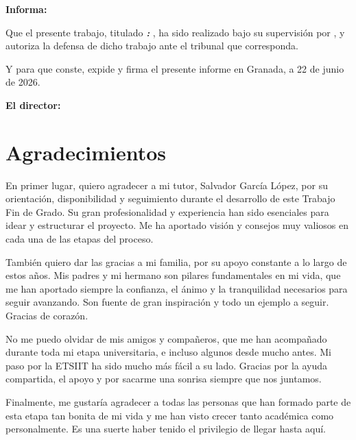 \vspace{0.5cm}

\textbf{Informa:}

\vspace{0.5cm}

Que el presente trabajo, titulado \textit{\textbf{\myTitle: \mySubTitle}},
ha sido realizado bajo su supervisión por \textbf{\myName}, y autoriza la defensa de dicho trabajo ante el tribunal
que corresponda.

\vspace{0.5cm}

Y para que conste, expide y firma el presente informe en Granada, a 22 de junio de 2026.

\vspace{1cm}

\textbf{El director:}

\vspace{5cm}

\noindent \textbf{\myProf}



\chapter*{Agradecimientos}
\thispagestyle{empty}

\vspace{1cm}

En primer lugar, quiero agradecer a mi tutor, Salvador García López, por su orientación, disponibilidad y seguimiento durante el desarrollo de este Trabajo Fin de Grado. Su gran profesionalidad y experiencia han sido esenciales para idear y estructurar el proyecto. Me ha aportado visión y consejos muy valiosos en cada una de las etapas del proceso.

También quiero dar las gracias a mi familia, por su apoyo constante a lo largo de estos años. Mis padres y mi hermano son pilares fundamentales en mi vida, que me han aportado siempre la confianza, el ánimo y la tranquilidad necesarios para seguir avanzando. Son fuente de gran inspiración y todo un ejemplo a seguir. Gracias de corazón.

No me puedo olvidar de mis amigos y compañeros, que me han acompañado durante toda mi etapa universitaria, e incluso algunos desde mucho antes. Mi paso por la ETSIIT ha sido mucho más fácil a su lado. Gracias por la ayuda compartida, el apoyo y por sacarme una sonrisa siempre que nos juntamos.

Finalmente, me gustaría agradecer a todas las personas que han formado parte de esta etapa tan bonita de mi vida y me han visto crecer tanto académica como personalmente. Es una suerte haber tenido el privilegio de llegar hasta aquí.

